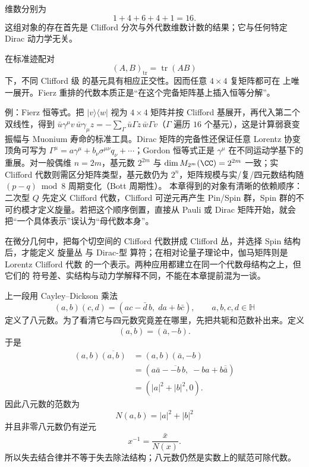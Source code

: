 维数分别为
\[
1+4+6+4+1=16.
\]
这组对象的存在首先是 Clifford 分次与外代数维数计数的结果；它与任何特定 Dirac 动力学无关。

在标准迹配对
\[
(A,B)_{\operatorname{tr}}
=\operatorname{tr}(AB)
\]
下，不同 Clifford 级 的基元具有相应正交性。因而任意 $4\times4$ 复矩阵都可在 上唯一展开。Fierz 重排的代数本质正是“在这个完备矩阵基上插入恒等分解”。

例：Fierz 恒等式。把 $|v\rangle\langle w|$ 视为 $4\times4$ 矩阵并按 Clifford 基展开，再代入第二个双线性，得到 $\bar u\gamma^\mu v\,\bar w\gamma_\mu z=-\sum_\Gamma\bar u\Gamma z\,\bar w\Gamma v$（$\Gamma$ 遍历 $16$ 个基元），这是计算弱衰变振幅与 Muonium 寿命的标准工具。Dirac 矩阵的完备性还保证任意 Lorentz 协变顶角可写为 $\Gamma^\mu=a\gamma^\mu+b_\nu\sigma^{\mu\nu}q_\nu+\cdots$；Gordon 恒等式正是 $\gamma^\mu$ 在不同运动学基下的重展。对一般偶维 $n=2m$，基元数 $2^{2m}$ 与 $\dim M_{2^m}(\CC)=2^{2m}$ 一致；实 Clifford 代数则需区分矩阵类型，基元数仍为 $2^n$，矩阵规模与实/复/四元数结构随 $(p-q)\bmod 8$ 周期变化（Bott 周期性）。
本章得到的对象有清晰的依赖顺序：二次型 $Q$ 先定义 Clifford 代数，Clifford 可逆元再产生 Pin/Spin 群，Spin 群的不可约模才定义旋量。若把这个顺序倒置，直接从 Pauli 或 Dirac 矩阵开始，就会把“一个具体表示”误认为“母代数本身”。

在微分几何中，把每个切空间的 Clifford 代数拼成 Clifford 丛，并选择 Spin 结构 后，才能定义 旋量丛 与 Dirac-型 算符；在相对论量子理论中，伽马矩阵则是 Lorentz Clifford 代数 的一个表示。两种应用都建立在同一个代数母结构之上，但它们的 符号差、实结构与动力学解释不同，不能在本章提前混为一谈。

上一段用 Cayley--Dickson 乘法
\[
(a,b)(c,d)=(ac-\bar d\,b,\;da+b\bar c),
\qquad a,b,c,d\in\mathbb H
\]
定义了八元数。为了看清它与四元数究竟差在哪里，先把共轭和范数补出来。定义
\[
\overline{(a,b)}=(\bar a,-b).
\]
于是
\[
\begin{aligned}
(a,b)\overline{(a,b)}
&=(a,b)(\bar a,-b)\\
&=(a\bar a-\overline{-b}\,b,\;-ba+b\overline{\bar a})\\
&=(|a|^2+|b|^2,0).
\end{aligned}
\]
因此八元数的范数为
\begin{equation*}{
N(a,b)=|a|^2+|b|^2
}\end{equation*}
并且非零八元数仍有逆元
\[
x^{-1}=\frac{\bar x}{N(x)}.
\]
所以失去结合律并不等于失去除法结构；八元数仍然是实数上的赋范可除代数。

